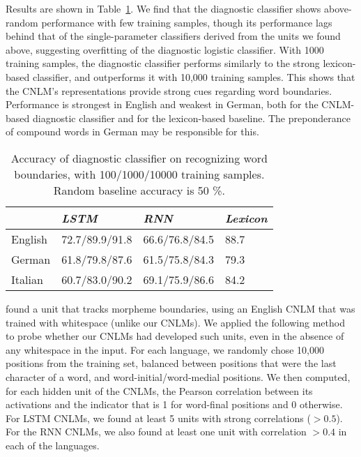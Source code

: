 Results are shown in Table~\ref{tab:segmentation-results}.
We find that the diagnostic classifier shows above-random performance with few training samples, though its performance lags behind that of the single-parameter classifiers derived from the units we found above, suggesting overfitting of the diagnostic logistic classifier.
With 1000 training samples, the diagnostic classifier performs similarly to the strong lexicon-based classifier, and outperforms it with 10,000 training samples.
This shows that the CNLM's representations provide strong cues regarding word boundaries.
Performance is strongest in English and weakest in German, both for the CNLM-based diagnostic classifier and for the lexicon-based baseline.
The preponderance of compound words in German may be responsible for this.




\begin{table}[t]
	\small
  \begin{center}
    \begin{tabular}{l|l|l|l}
      \multicolumn{1}{c|}{}&\emph{LSTM}&\emph{RNN}&\emph{Lexicon}\\
      \hline
      English & 72.7/89.9/91.8 &  66.6/76.8/84.5  &  88.7   \\ 
      German & 61.8/79.8/87.6  &  61.5/75.8/84.3 &  79.3  \\ 
      Italian &  60.7/83.0/90.2 &  69.1/75.9/86.6  &  84.2   \\ 
    \end{tabular}
  \end{center}
  \caption{\label{tab:segmentation-results} Accuracy of diagnostic classifier on recognizing word boundaries, with 100/1000/10000 training samples. Random baseline accuracy is 50 \%.}
\end{table}



 found a unit that tracks morpheme boundaries, using an English CNLM that was trained with whitespace (unlike our CNLMs).
We applied the following method to probe whether our CNLMs had developed such units, even in the absence of any whitespace in the input.
For each language, we randomly chose 10,000 positions from the training set, balanced between positions that were the last character of a word, and word-initial/word-medial positions.
We then computed, for each hidden unit of the CNLMs, the Pearson correlation between its activations and the indicator that is 1 for word-final positions and 0 otherwise.
For LSTM CNLMs, we found at least 5 units with strong correlations ($>0.5$). For the RNN CNLMs, we also found at least one unit with correlation $> 0.4$ in each of the languages.

